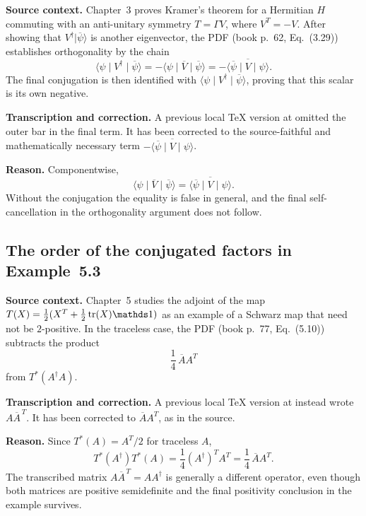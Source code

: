 \documentclass{article}
\begin{document}
\textbf{Source context.}  Chapter~3 proves Kramer's theorem for a Hermitian
$H$ commuting with an anti-unitary symmetry $T=\Gamma V$, where $V^T=-V$.
After showing that $V^\dagger\lvert\overline\psi\rangle$ is another eigenvector,
the PDF (book p.~62, Eq.~(3.29)) establishes orthogonality by the chain
\begin{equation}\tag{PDF (3.29)}
 \langle\psi\mid V^\dagger\mid\overline\psi\rangle
 =-\langle\psi\mid\overline V\mid\overline\psi\rangle
 =-\overline{\langle\overline\psi\mid V\mid\psi\rangle}.
\end{equation}
The final conjugation is then identified with
$\langle\psi\mid V^\dagger\mid\overline\psi\rangle$, proving that this scalar
is its own negative.

\textbf{Transcription and correction.}  A previous local TeX version at
 omitted the outer bar in the final
term.  It has been corrected to the source-faithful and mathematically
necessary term $-\overline{\langle\overline\psi\mid V\mid\psi\rangle}$.

\textbf{Reason.}  Componentwise,
\begin{equation}
 \langle\psi\mid\overline V\mid\overline\psi\rangle
 =\overline{\langle\overline\psi\mid V\mid\psi\rangle}.
\end{equation}
Without the conjugation the equality is false in general, and the final
self-cancellation in the orthogonality argument does not follow.

\subsection{The order of the conjugated factors in Example~5.3}

\textbf{Source context.}  Chapter~5 studies the adjoint of the map
$T(X)=\tfrac12(X^T+\tfrac12\operatorname{tr}(X)\one)$ as an example of a
Schwarz map that need not be $2$-positive.  In the traceless case, the PDF
(book p.~77, Eq.~(5.10)) subtracts the product
\begin{equation}\tag{PDF (5.10), relevant term}
  \frac14\,\overline A A^T
\end{equation}
from $T^*(A^\dagger A)$.

\textbf{Transcription and correction.}  A previous local TeX version at
 instead wrote
$A\overline A^{\,T}$.  It has been corrected to $\overline A A^T$, as in the
source.

\textbf{Reason.}  Since $T^*(A)=A^T/2$ for traceless $A$,
\begin{equation}
 T^*(A^\dagger)T^*(A)
 =\frac14(A^\dagger)^T A^T
 =\frac14\,\overline A A^T.
\end{equation}
The transcribed matrix $A\overline A^{\,T}=AA^\dagger$ is generally a
different operator, even though both matrices are positive semidefinite and
the final positivity conclusion in the example survives.
\end{document}
